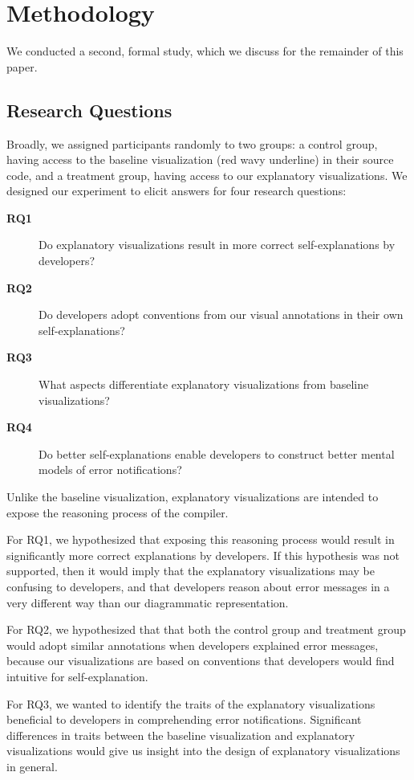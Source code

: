 \documentclass[conference]{IEEEtran}
\begin{document}
\section{Methodology}

We conducted a second, formal study, which we discuss for the remainder of this paper.

\subsection{Research Questions}

Broadly, we assigned participants randomly to two groups: a control group, having access to the baseline visualization (red wavy underline) in their source code, and a treatment group, having access to our explanatory visualizations. We designed our experiment to elicit answers for four research questions:

\begin{description}
\item[\textbf{RQ1}] Do explanatory visualizations result in more correct self-explanations by developers?
\item[\textbf{RQ2}] Do developers adopt conventions from our visual annotations in their own self-explanations?
\item[\textbf{RQ3}] What aspects differentiate explanatory visualizations from baseline visualizations?
\item[\textbf{RQ4}] Do better self-explanations enable developers to construct better mental models of error notifications?
\end{description}

Unlike the baseline visualization, explanatory visualizations are intended to expose the reasoning process of the compiler. 

For RQ1, we hypothesized that exposing this reasoning process would result in significantly more correct explanations by developers. If this hypothesis was not supported, then it would imply that the explanatory visualizations may be confusing to developers, and that developers reason about error messages in a very different way than our diagrammatic representation.

For RQ2, we hypothesized that that both the control group and treatment group would adopt similar annotations when developers explained error messages, because our visualizations are based on conventions that developers would find intuitive for self-explanation.

For RQ3, we wanted to identify the traits of the explanatory visualizations beneficial to developers in comprehending error notifications. Significant differences in traits between the baseline visualization and explanatory visualizations would give us insight into the design of explanatory visualizations in general.
\end{document}
